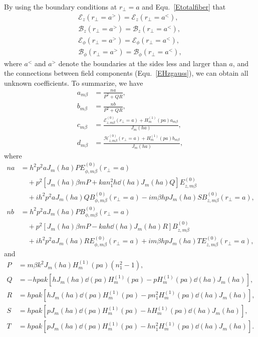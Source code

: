 \documentclass[preprint,aps,pra,onecolumn]{revtex4-1} %
\begin{document}
By using the boundary conditions at $ r\!_\perp=a $ and Equ.~\ref{Etotalfiber} that
\begin{align}
\mathcal{E}_{z}(r\!_\perp =a^> ) = \mathcal{E}_{z}(r\!_\perp =a^< ),\\
\mathcal{B}_{z}(r\!_\perp =a^> ) = \mathcal{B}_{z}(r\!_\perp =a^< ),\\
\mathcal{E}_{\phi}(r\!_\perp =a^> ) = \mathcal{E}_{\phi}(r\!_\perp =a^< ),\\
\mathcal{B}_{\phi}(r\!_\perp =a^> ) = \mathcal{B}_{\phi}(r\!_\perp =a^< ),
\end{align}
where $ a^< $ and $ a^> $ denote the boundaries at the sides less and larger than $ a $, and the connections between field components (Equ.~\eqref{EHzgauss}), we can obtain all unknown coefficients. To summarize, we have~\cite{Klimov2004}
\begin{align}
a_{m\beta} &= \frac{na}{P^2+QR},\\
b_{m\beta} &= \frac{nb}{P^2+QR},\\
c_{m\beta} &= \frac{\mathcal{E}_{z,m\beta}^{(0)}(r\!_\perp\!=\!a)+ H_m^{(1)}(pa)a_{m\beta}}{J_m(ha)},\\
d_{m\beta} &= \frac{\mathcal{H}_{z,m\beta}^{(0)}(r\!_\perp\!=\!a)+ H_m^{(1)}(pa)b_{m\beta}}{J_m(ha)},
\end{align}
where
\begin{align}
na &= h^2p^2aJ_m(ha)PE_{\phi,m\beta}^{(0)}(r\!_\perp\!=\!a) \nonumber\\
&\quad + p^2\left[J_m(ha)\beta mP+kan_1^2h \dd{}{(ha)}J_m(ha)Q \right] E_{z,m\beta}^{(0)} \nonumber\\
&\quad + ih^2p^2 aJ_m(ha)QB_{\phi,m\beta}^{(0)}(r\!_\perp\!\!=\!a) \!-\! im\beta hpJ_m(ha)SB_{z,m\beta}^{(0)}(r\!_\perp\!\!=\!a),\\
nb &= h^2p^2aJ_m(ha)PB_{\phi,m\beta}^{(0)}(r\!_\perp\!=\!a) \nonumber\\
&\quad + p^2\left[J_m(ha)\beta mP-kah \dd{}{(ha)}J_m(ha)R \right] B_{z,m\beta}^{(0)} \nonumber\\
&\quad + ih^2p^2 aJ_m(ha)RE_{\phi,m\beta}^{(0)}(r\!_\perp\!\!=\!a) \!+\! im\beta hpJ_m(ha)TE_{z,m\beta}^{(0)}(r\!_\perp\!\!=\!a),
\end{align} 
and
\begin{align}
P &=m\beta k^2J_m(ha)H_m^{(1)}(pa)(n_1^2-1),\\
Q &=-hpak\left[ hJ_m(ha)\dd{}{(pa)}H_m^{(1)}(pa)-pH_m^{(1)}(pa)\dd{}{(ha)}J_m(ha) \right],\\
R &=hpak\left[ hJ_m(ha)\dd{}{(pa)}H_m^{(1)}(pa)-pn_1^2H_m^{(1)}(pa)\dd{}{(ha)}J_m(ha) \right],\\
S &=hpak\left[ pJ_m(ha)\dd{}{(pa)}H_m^{(1)}(pa)-hH_m^{(1)}(pa)\dd{}{(ha)}J_m(ha) \right],\\
T &=hpak\left[ pJ_m(ha)\dd{}{(pa)}H_m^{(1)}(pa)-hn_1^2H_m^{(1)}(pa)\dd{}{(ha)}J_m(ha) \right].
\end{align}
\end{document}
